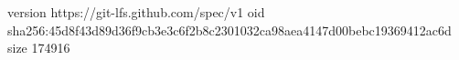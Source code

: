 version https://git-lfs.github.com/spec/v1
oid sha256:45d8f43d89d36f9cb3e3c6f2b8c2301032ca98aea4147d00bebc19369412ac6d
size 174916
